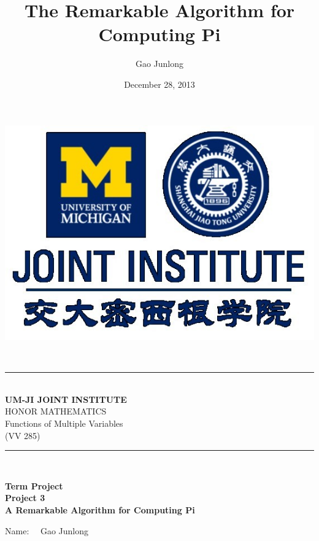 \documentclass{report}
\title{The Remarkable Algorithm for Computing Pi}
\author{Gao Junlong}
\date{December 28, 2013}
\begin{document}
\begin{titlepage}

\newcommand{\HRule}{\rule{\linewidth}{0.5mm}} %

\centering %

\begin{center}
\includegraphics[width=6 cm]{Title.jpg}
\end{center}
\begin{center}
$\quad$
\\[0cm]
\end{center}
\HRule \\[0.4cm]
{ \large \bf  UM-JI JOINT INSTITUTE}\\[0.4cm]
 {HONOR MATHEMATICS\\
 Functions of Multiple Variables\\
 (VV 285)}\\%
\HRule \\[2cm]
 
\begin{center}
\Large \bf Term Project\\[0.8cm]
\large \bf Project 3\\[0.8cm]
\large \bf A Remarkable Algorithm for Computing Pi \\
[5cm]
\end{center}
\begin{minipage}{0.8\textwidth}
\begin{flushleft} 
Name: $\quad$Gao Junlong\\
\end{flushleft}
\end{minipage}\\[0.8cm]


\end{titlepage}
\end{document}
